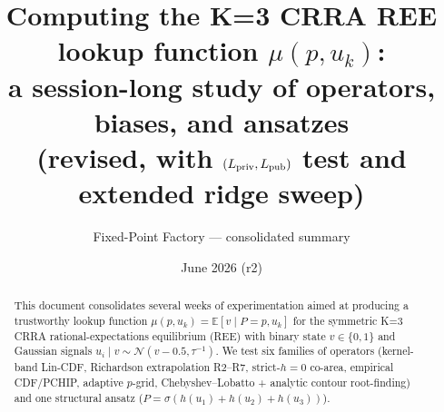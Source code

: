 \documentclass[11pt]{article}
\title{Computing the K=3 CRRA REE lookup function $\mu(p, u_k)$:\\
       a session-long study of operators, biases, and ansatzes\\
       \large{(revised, with $(L_{\rm priv}, L_{\rm pub})$ test and extended ridge sweep)}}
\author{Fixed-Point Factory --- consolidated summary}
\date{June 2026 (r2)}
\begin{document}
\maketitle

\begin{abstract}
\noindent
This document consolidates several weeks of experimentation aimed at
producing a trustworthy lookup function $\mu(p, u_k) = \mathbb{E}[v \mid P = p, u_k]$
for the symmetric K=3 CRRA rational-expectations equilibrium (REE) with
binary state $v \in \{0, 1\}$ and Gaussian signals $u_i \mid v \sim
\mathcal{N}(v - 0.5, \tau^{-1})$. We test six families of operators
(kernel-band Lin-CDF, Richardson extrapolation R2--R7, strict-$h{=}0$ co-area,
empirical CDF/PCHIP, adaptive $p$-grid, Chebyshev--Lobatto + analytic
contour root-finding) and one structural ansatz
($P = \sigma(h(u_1) + h(u_2) + h(u_3))$).


\end{abstract}
\end{document}
